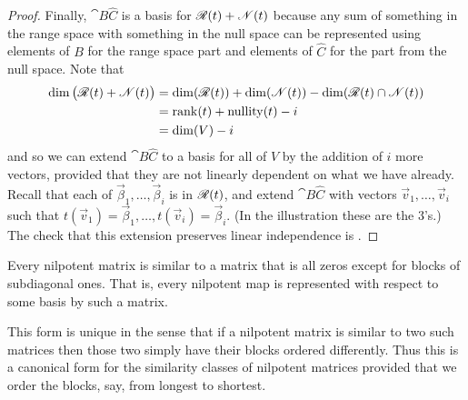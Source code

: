 \begin{proof}
Finally, \( \cat{B}{\hat{C}} \)
is a basis for \( \mathscr{R}(t)+\mathscr{N}(t) \)
because any sum of something in the range space with something in the null space
can be represented using elements of \( B \) for the range space 
part and elements of \( \hat{C} \) for the part from the null space.
Note that
\begin{align*}
  \dim\big(\mathscr{R}(t)+\mathscr{N}(t)\big)
  &=
  \dim (\mathscr{R}(t))+\dim (\mathscr{N}(t))
    -\dim(\mathscr{R}(t)\cap\mathscr{N}(t))  \\
  &=
  \operatorname{rank} (t)+\operatorname{nullity} (t)-i          \\
  &=
  \dim (V)-i
\end{align*}
and so we can extend \( \cat{B}{\hat{C}} \) to a basis for all of 
\( V \) by the addition of \( i \) more vectors, provided that
they are not linearly dependent on what we have already.
Recall that each of \( \vec{\beta}_1,\dots,\vec{\beta}_i \) is
in \( \mathscr{R}(t) \), and extend \( \cat{B}{\hat{C}} \) with vectors
\( \vec{v}_1,\dots,\vec{v}_i \) such that
\( t(\vec{v}_1)=\vec{\beta}_1,\dots,t(\vec{v}_i)=\vec{\beta}_i \).
(In the illustration these are the \( 3 \)'s.)
The check that this extension preserves linear independence is
.
\end{proof}

\begin{corollary} \label{cor:NilpotentMatCanonForm}
Every nilpotent matrix is similar to a matrix that is all zeros
except for blocks of subdiagonal ones.
That is, every nilpotent map is represented with respect to some basis by
such a matrix.
\end{corollary}

This form is unique in the sense that if a nilpotent matrix is similar to two
such matrices then those two simply have their blocks ordered differently.
Thus this is
a canonical form for the similarity classes of nilpotent matrices
provided that we order the blocks, say, from longest to shortest.

